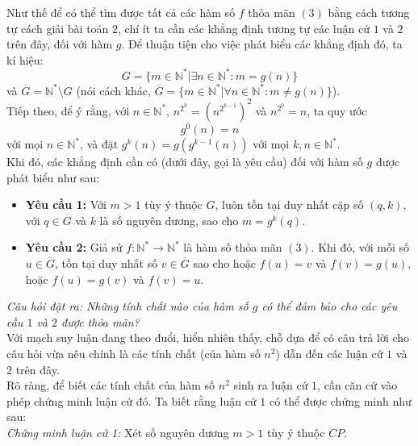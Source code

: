 \noindent Như thế để có thể tìm được tất cả các hàm số $f$ thỏa mãn $(3)$ bằng cách tương tự cách giải bài toán $2$, chí ít ta cần các khẳng định tương tự các luận cứ $1$ và $2$ trên đây, đối với hàm $g$. Để thuận tiện cho việc phát biểu các khẳng định đó, ta kí hiệu: $$G=\{m\in\mathbb{N}^*|\exists n\in\mathbb{N}^*:m=g(n)\}$$ 
và $\overline{G}=\mathbb{N}^*\setminus G$ (nói cách khác, $\overline{G}=\{m\in\mathbb{N}^*|\forall n\in\mathbb{N}^*:m\ne g(n)\}$).\\
Tiếp theo, để ý rằng, với $n\in\mathbb{N}^*$, $n^{2^k}=(n^{2^{k-1}})^2$ và $n^{2^0}=n$, ta quy ước $$g^0(n)=n$$
với mọi $n\in\mathbb{N}^*$, và đặt $g^k(n)=g(g^{k-1}(n))$ với mọi $k,n\in\mathbb{N}^*$.\\
Khi đó, các khẳng định cần có (dưới đây, gọi là yêu cầu) đối với hàm số $g$ được phát biểu như sau: 
\begin{itemize}
	\item \textbf{Yêu cầu 1:} Với $m>1$ tùy ý thuộc $G$, luôn tồn tại duy nhất cặp số $(q,k)$, với $q\in\overline{G}$ và $k$ là số nguyên dương, sao cho $m=g^k(q)$.
	\item \textbf{Yêu cầu 2:} Giả sử $f:\mathbb{N}^*\rightarrow\mathbb{N}^*$ là hàm số thỏa mãn $(3)$. Khi đó, với mỗi số $u\in\overline{G}$, tồn tại duy nhất số $v\in\overline{G}$ sao cho hoặc $f(u)=v$ và $f(v)=g(u)$, hoặc $f(u)=g(v)$ và $f(v)=u$.    
\end{itemize}
\noindent \textit{Câu hỏi đặt ra: Những tính chất nào của hàm số $g$ có thể đảm bảo cho các yêu cầu $1$ và $2$ được thỏa mãn?}\\
Với mạch suy luận đang theo đuổi, hiển nhiên thấy, chỗ dựa để có câu trả lời cho câu hỏi vừa nêu chính là các tính chất (của hàm số $n^2$) dẫn đến các luận cứ $1$ và $2$ trên đây.\\
Rõ ràng, để biết các tính chất của hàm số $n^2$ sinh ra luận cứ $1$, cần căn cứ vào phép chứng minh luận cứ đó. Ta biết rằng luận cứ $1$ có thể được chứng minh như sau:\\
\textit{Chứng minh luận cứ 1:} Xét số nguyên dương $m>1$ tùy ý thuộc $CP$.
